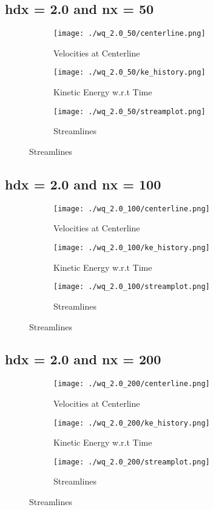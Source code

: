 \documentclass[12pt, a4paper]{report}
\begin{document}
\subsection{hdx = 2.0 and nx = 50}
\begin{figure}[H]
\begin{subfigure}{0.5\textwidth}
	\texttt{[image: ./wq\_2.0\_50/centerline.png]}
	\caption{Velocities at Centerline}
\end{subfigure}
\begin{subfigure}{0.5\textwidth}
	\texttt{[image: ./wq\_2.0\_50/ke\_history.png]}
	\caption{Kinetic Energy w.r.t Time}
\end{subfigure}
\medskip
\begin{subfigure}{\textwidth}
	\centering
	\texttt{[image: ./wq\_2.0\_50/streamplot.png]}
	\caption{Streamlines}
\end{subfigure}
\end{figure}

\subsection{hdx = 2.0 and nx = 100}
\begin{figure}[H]
\begin{subfigure}{0.5\textwidth}
	\texttt{[image: ./wq\_2.0\_100/centerline.png]}
	\caption{Velocities at Centerline}
\end{subfigure}
\begin{subfigure}{0.5\textwidth}
	\texttt{[image: ./wq\_2.0\_100/ke\_history.png]}
	\caption{Kinetic Energy w.r.t Time}
\end{subfigure}
\medskip
\begin{subfigure}{\textwidth}
	\texttt{[image: ./wq\_2.0\_100/streamplot.png]}
	\caption{Streamlines}
\end{subfigure}
\end{figure}

\subsection{hdx = 2.0 and nx = 200}
\begin{figure}[H]
\begin{subfigure}{0.5\textwidth}
	\texttt{[image: ./wq\_2.0\_200/centerline.png]}
	\caption{Velocities at Centerline}
\end{subfigure}
\begin{subfigure}{0.5\textwidth}
	\texttt{[image: ./wq\_2.0\_200/ke\_history.png]}
	\caption{Kinetic Energy w.r.t Time}
\end{subfigure}
\medskip
\begin{subfigure}{\textwidth}
	\texttt{[image: ./wq\_2.0\_200/streamplot.png]}
	\caption{Streamlines}
\end{subfigure}
\end{figure}
\end{document}
